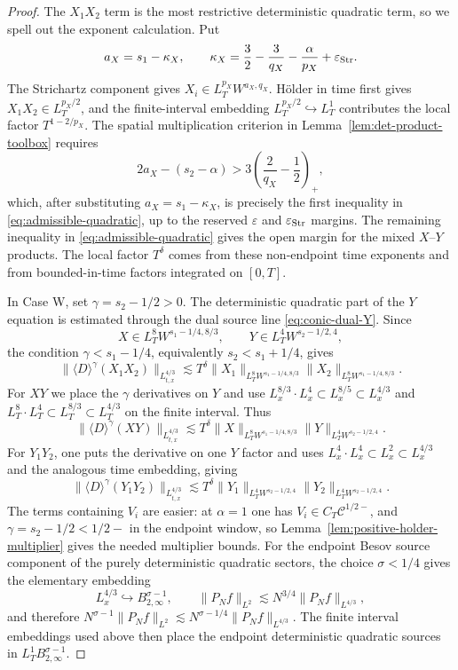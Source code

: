 \documentclass[10pt]{amsart}
\numberwithin{equation}{section}
\theoremstyle{plain}
\theoremstyle{definition}
\theoremstyle{remark}
\newcommand{\eps}{\varepsilon}
\begin{document}
\begin{proof}
The $X_1X_2$ term is the most restrictive deterministic quadratic term, so we spell out the exponent calculation.  Put
\[
        a_X=s_1-\kappa_X,
        \qquad
        \kappa_X=\frac32-\frac3{q_X}-\frac{\alpha}{p_X}+\eps_{\rm Str}.
\]
The Strichartz component gives $X_i\in L_T^{p_X}W^{a_X,q_X}$.  H\"older in time first gives $X_1X_2\in L_T^{p_X/2}$, and the finite-interval embedding $L_T^{p_X/2}\hookrightarrow L_T^1$ contributes the local factor $T^{1-2/p_X}$.  The spatial multiplication criterion in Lemma~\ref{lem:det-product-toolbox} requires
\[
        2a_X-(s_2-\alpha)>3\left(\frac2{q_X}-\frac12\right)_+,
\]
which, after substituting $a_X=s_1-\kappa_X$, is precisely the first inequality in \eqref{eq:admissible-quadratic}, up to the reserved $\eps$ and $\eps_{\rm Str}$ margins.  The remaining inequality in \eqref{eq:admissible-quadratic} gives the open margin for the mixed $X$--$Y$ products.  The local factor $T^\delta$ comes from these non-endpoint time exponents and from bounded-in-time factors integrated on $[0,T]$.

In Case W, set $\gamma=s_2-1/2>0$.  The deterministic quadratic part of the $Y$ equation is estimated through the dual source line \eqref{eq:conic-dual-Y}.  Since
\[
        X\in L_T^8W^{s_1-1/4,8/3},
        \qquad
        Y\in L_T^4W^{s_2-1/2,4},
\]
the condition $\gamma<s_1-1/4$, equivalently $s_2<s_1+1/4$, gives
\begin{equation}\label{eq:endpoint-XX-source}
 \|\langle D\rangle^\gamma(X_1X_2)\|_{L_{t,x}^{4/3}}
 \lesssim T^\delta
 \|X_1\|_{L_T^8W^{s_1-1/4,8/3}}
 \|X_2\|_{L_T^8W^{s_1-1/4,8/3}}.
\end{equation}
For $XY$ we place the $\gamma$ derivatives on $Y$ and use
$L_x^{8/3}\cdot L_x^4\subset L_x^{8/5}\subset L_x^{4/3}$ and
$L_T^8\cdot L_T^4\subset L_T^{8/3}\subset L_T^{4/3}$ on the finite interval.  Thus
\begin{equation}\label{eq:endpoint-XY-source}
 \|\langle D\rangle^\gamma(XY)\|_{L_{t,x}^{4/3}}
 \lesssim T^\delta
 \|X\|_{L_T^8W^{s_1-1/4,8/3}}
 \|Y\|_{L_T^4W^{s_2-1/2,4}}.
\end{equation}
For $Y_1Y_2$, one puts the derivative on one $Y$ factor and uses
$L_x^4\cdot L_x^4\subset L_x^2\subset L_x^{4/3}$ and the analogous time embedding, giving
\begin{equation}\label{eq:endpoint-YY-source}
 \|\langle D\rangle^\gamma(Y_1Y_2)\|_{L_{t,x}^{4/3}}
 \lesssim T^\delta
 \|Y_1\|_{L_T^4W^{s_2-1/2,4}}
 \|Y_2\|_{L_T^4W^{s_2-1/2,4}}.
\end{equation}
The terms containing $V_i$ are easier: at $\alpha=1$ one has $V_i\in C_T\mathcal C^{1/2-}$, and $\gamma=s_2-1/2<1/2-$ in the endpoint window, so Lemma~\ref{lem:positive-holder-multiplier} gives the needed multiplier bounds.  For the endpoint Besov source component of the purely deterministic quadratic sectors, the choice $\sigma<1/4$ gives the elementary embedding
\[
        L_x^{4/3}\hookrightarrow B_{2,\infty}^{\sigma-1},
        \qquad
        \|P_N f\|_{L^2}\lesssim N^{3/4}\|P_N f\|_{L^{4/3}},
\]
and therefore $N^{\sigma-1}\|P_Nf\|_{L^2}\lesssim N^{\sigma-1/4}\|P_Nf\|_{L^{4/3}}$.  The finite interval embeddings used above then place the endpoint deterministic quadratic sources in $L_T^1B_{2,\infty}^{\sigma-1}$.



\end{proof}
\end{document}
